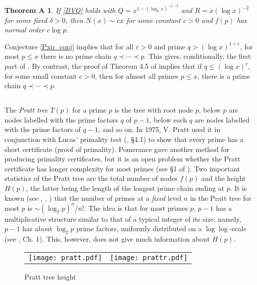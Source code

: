 \documentclass[12pt]{amsart}
\theoremstyle{remark}
\theoremstyle{plain}
\numberwithin{equation}{section}
\newcommand{\del}{\ensuremath{\delta}}
\newcommand{\eps}{\ensuremath{\varepsilon}}
\renewcommand{\(}{\left(}
\renewcommand{\)}{\right)}
\renewcommand{\le}{\leqslant}
\begin{document}
\newtheorem*{theoremA}{Theorem A}
\begin{theoremA}\label{EGPSthm}
If \eqref{BVQ} holds with $Q=x^{1-(\log_2 x)^{-1-\del}}$ and 
$R=x(\log x)^{-2}$
for some fixed $\del>0$,  then $N(x)\sim c x$ for some constant
$c>0$ and $f(p)$ has normal order $c \log p$.
\end{theoremA}


Conjecture \ref{Pxp_conj} implies that for all $\eps>0$
and prime $q>(\log x)^{1+\eps}$, for most $p\le x$ there is no
prime chain $q \prec \cdots \prec p$.
 This gives, conditionally, the first part of \cite[Conjecture 1]{EGPS}.
By contrast,
the proof of Theorem 4.5 of \cite{EGPS} implies that if $q\le (\log x)^c$,
for some small constant $c>0$, then  for
almost all primes $p\le x$, there is a prime chain $q\prec \cdots \prec p$.




\subsection{}
The {\it Pratt tree} $T(p)$ for a prime $p$ is the tree with root node $p$,
below $p$ are nodes labelled with the prime factors $q$ of $p-1$, below
each $q$ are nodes labelled with the prime factors of $q-1$, and so on.
In 1975, V. Pratt  \cite{Pr} used
it in conjunction with Lucas' primality test (\cite{CP}, \S 4.1)
to show that every prime has a short certificate (proof of primality).
Pomerance \cite{Pom87} gave another method for producing primality
certificates, but it is an open
problem whether the Pratt certificate has longer complexity for most primes
(see \S 1 of \cite{Pom87}).
Two important statistics of the Pratt tree are the total number of nodes
$f(p)$ and the height $H(p)$, the latter being the length of the longest
prime chain ending at $p$.
It is known (see \cite{BKW}, \cite{Er35}, \cite{EP}) that the number
of primes at a \emph{fixed} level $n$ in the Pratt tree for most $p$ is 
$\sim (\log_2 p)^{n}/n!$.  The idea is that for most
primes $p$, $p-1$ has a multiplicative structure similar to that of
a typical integer of its size; namely, $p-1$ has
about $\log_2 p$ prime factors, uniformly
distributed on a $\log\log$-scale (see \cite{HaTe}, Ch. 1).
This, however, does not give much information about $H(p)$.

\begin{figure}[t]
\vskip -0.2in
\begin{tabular}{cc}
\texttt{[image: pratt.pdf]} &
\texttt{[image: prattr.pdf]} 
\end{tabular}
\vskip -0.3in
\caption{Pratt tree height}\label{figure2}
\end{figure}
\end{document}
